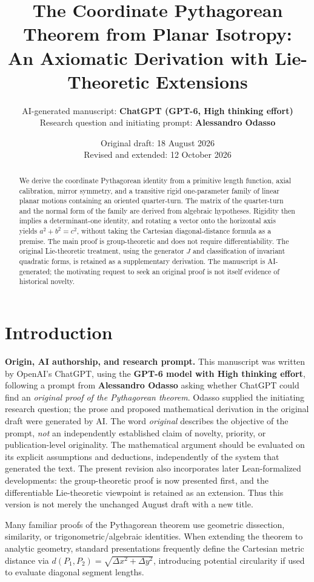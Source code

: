 \documentclass[11pt,a4paper]{article}
\title{\textbf{The Coordinate Pythagorean Theorem from Planar Isotropy:}\\[0.25em]
\large An Axiomatic Derivation with Lie-Theoretic Extensions}
\author{\normalsize AI-generated manuscript: \textbf{ChatGPT (GPT-6, High thinking effort)}\\
\normalsize Research question and initiating prompt: \textbf{Alessandro Odasso}}
\date{Original draft: 18 August 2026\\Revised and extended: 12 October 2026}
\begin{document}
\maketitle
\begin{abstract}
We derive the coordinate Pythagorean identity from a primitive length function,
axial calibration, mirror symmetry, and a transitive rigid one-parameter
family of linear planar motions containing an oriented quarter-turn.
The matrix of the quarter-turn and the normal form of the family are
derived from algebraic hypotheses. Rigidity then implies a determinant-one
identity, and rotating a vector onto the horizontal axis yields
$a^2+b^2=c^2$, without taking the Cartesian diagonal-distance formula
as a premise. The main proof is group-theoretic and does not require
differentiability. The original Lie-theoretic treatment, using the generator
$J$ and classification of invariant quadratic forms, is retained as a
supplementary derivation. The manuscript is AI-generated; the motivating
request to seek an original proof is not itself evidence of historical novelty.
\end{abstract}

\section{Introduction}\label{sec:introduction}
\noindent\textbf{Origin, AI authorship, and research prompt.}
This manuscript was written by OpenAI's ChatGPT, using the \textbf{GPT-6 model with High thinking effort}, following a prompt from \textbf{Alessandro Odasso} asking whether ChatGPT could find an \emph{original proof of the Pythagorean theorem}. Odasso supplied the initiating research question; the prose and proposed mathematical derivation in the original draft were generated by AI. The word \emph{original} describes the objective of the prompt, \emph{not} an independently established claim of novelty, priority, or publication-level originality. The mathematical argument should be evaluated on its explicit assumptions and deductions, independently of the system that generated the text. The present revision also incorporates later Lean-formalized developments: the group-theoretic proof is now presented first, and the differentiable Lie-theoretic viewpoint is retained as an extension. Thus this version is not merely the unchanged August draft with a new title.

Many familiar proofs of the Pythagorean theorem use geometric dissection, similarity, or trigonometric/algebraic identities. When extending the theorem to analytic geometry, standard presentations frequently define the Cartesian metric distance via $d(P_1,P_2)=\sqrt{\Delta x^2+\Delta y^2}$, introducing potential circularity if used to evaluate diagonal segment lengths.
\end{document}
